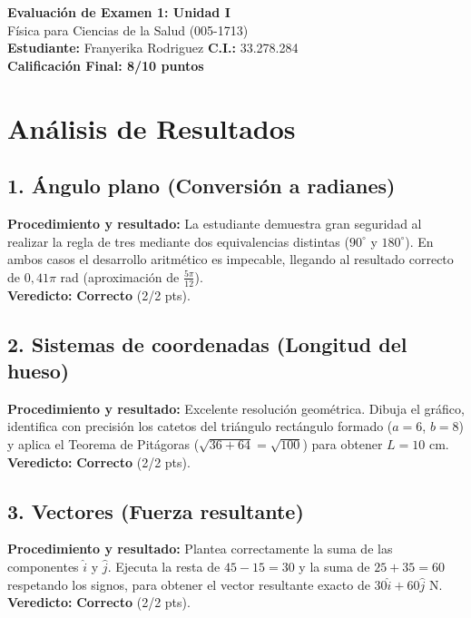 \documentclass[12pt]{article}
\begin{document}
\begin{center}
    \Large \textbf{Evaluación de Examen 1: Unidad I} \\
    \large Física para Ciencias de la Salud (005-1713) \\
    \vspace{0.5cm}
    \textbf{Estudiante:} Franyerika Rodriguez \quad \textbf{C.I.:} 33.278.284
    \vspace{0.3cm} \\
    \large \textbf{Calificación Final: 8/10 puntos}
\end{center}

\vspace{0.5cm}

\section*{Análisis de Resultados}

\subsection*{1. Ángulo plano (Conversión a radianes)}
\textbf{Procedimiento y resultado:} La estudiante demuestra gran seguridad al realizar la regla de tres mediante dos equivalencias distintas ($90^\circ$ y $180^\circ$). En ambos casos el desarrollo aritmético es impecable, llegando al resultado correcto de $0,41\pi$ rad (aproximación de $\frac{5\pi}{12}$). \\
\textbf{Veredicto:} \textbf{Correcto} (2/2 pts).

\subsection*{2. Sistemas de coordenadas (Longitud del hueso)}
\textbf{Procedimiento y resultado:} Excelente resolución geométrica. Dibuja el gráfico, identifica con precisión los catetos del triángulo rectángulo formado ($a=6$, $b=8$) y aplica el Teorema de Pitágoras ($\sqrt{36+64}=\sqrt{100}$) para obtener $L = 10$ cm. \\
\textbf{Veredicto:} \textbf{Correcto} (2/2 pts).

\subsection*{3. Vectores (Fuerza resultante)}
\textbf{Procedimiento y resultado:} Plantea correctamente la suma de las componentes $\hat{i}$ y $\hat{j}$. Ejecuta la resta de $45 - 15 = 30$ y la suma de $25 + 35 = 60$ respetando los signos, para obtener el vector resultante exacto de $30\hat{i} + 60\hat{j}$ N. \\
\textbf{Veredicto:} \textbf{Correcto} (2/2 pts).
\end{document}
